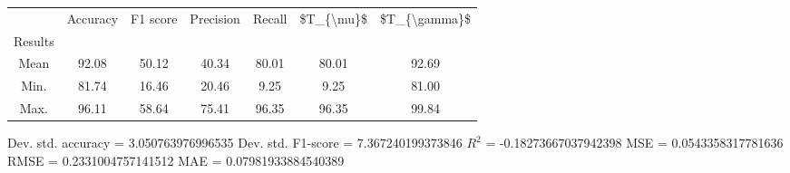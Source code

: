 \begin{tabular}{|c|c|c|c|c|c|c|}
\toprule
{} &  Accuracy &  F1 score &  Precision &  Recall &  \$T\_\{\textbackslash mu\}\$ &  \$T\_\{\textbackslash gamma\}\$ \\
Results &           &           &            &         &            &               \\
\hline
Mean    &     92.08 &     50.12 &      40.34 &   80.01 &      80.01 &         92.69 \\
Min.    &     81.74 &     16.46 &      20.46 &    9.25 &       9.25 &         81.00 \\
Max.    &     96.11 &     58.64 &      75.41 &   96.35 &      96.35 &         99.84 \\
\bottomrule
\end{tabular}

 Dev. std. accuracy = 3.050763976996535
 Dev. std. F1-score = 7.367240199373846
 $R^2$ = -0.18273667037942398
 MSE = 0.0543358317781636
 RMSE = 0.2331004757141512
 MAE = 0.07981933884540389